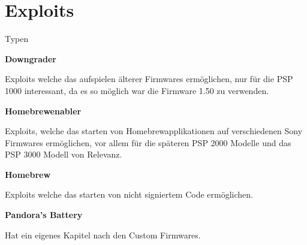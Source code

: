 \documentclass[mode=print,paper=screen,style=jefka]{powerdot}
\begin{document}
\section{Exploits}
\begin{slide}{Typen}
	\begin{large}\textbf{Downgrader}\end{large}\linebreak
	Exploits welche das aufspielen älterer Firmwares ermöglichen, nur für die PSP 1000 interessant, da es so möglich war die Firmware 1.50 zu verwenden.\linebreak
	\linebreak
	\begin{large}\textbf{Homebrewenabler}\end{large}\linebreak
	Exploits, welche das starten von Homebrewapplikationen auf verschiedenen Sony Firmwares ermöglichen, vor allem für die
	späteren PSP 2000 Modelle und das PSP 3000 Modell von Relevanz.\linebreak
	\linebreak
	\begin{large}\textbf{Homebrew}\end{large}\linebreak
	Exploits welche das starten von nicht signiertem Code ermöglichen.\linebreak
	\linebreak
	\begin{large}\textbf{Pandora's Battery}\end{large}\linebreak
	Hat ein eigenes Kapitel nach den Custom Firmwares.
\end{slide}
\end{document}
